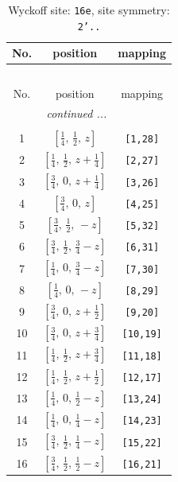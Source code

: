 \documentclass[fleqn,8pt]{jsarticle}
\begin{document}
\renewcommand{\arraystretch}{1.2}
\begin{longtable}{ccc}
\caption{Wyckoff site: {\tt 16e}, site symmetry: {\tt 2'..}}
 \\
 \hline \hline
No. & position & mapping \\ \hline \endfirsthead

\multicolumn{2}{l}{\tablename\ \thetable{}} \\
 \hline \hline
No. & position & mapping \\ \hline \endhead

 \hline \hline
\multicolumn{2}{r}{\footnotesize\it continued ...} \\ \endfoot

 \hline \hline
\multicolumn{2}{r}{} \\ \endlastfoot

1 & $\left[ \frac{1}{4},\, \frac{1}{2},\, z \right]$ & {\tt [1,28]} \\ \hline
2 & $\left[ \frac{1}{4},\, \frac{1}{2},\, z + \frac{1}{4} \right]$ & {\tt [2,27]} \\ \hline
3 & $\left[ \frac{3}{4},\, 0,\, z + \frac{1}{4} \right]$ & {\tt [3,26]} \\ \hline
4 & $\left[ \frac{3}{4},\, 0,\, z \right]$ & {\tt [4,25]} \\ \hline
5 & $\left[ \frac{3}{4},\, \frac{1}{2},\, - z \right]$ & {\tt [5,32]} \\ \hline
6 & $\left[ \frac{3}{4},\, \frac{1}{2},\, \frac{3}{4} - z \right]$ & {\tt [6,31]} \\ \hline
7 & $\left[ \frac{1}{4},\, 0,\, \frac{3}{4} - z \right]$ & {\tt [7,30]} \\ \hline
8 & $\left[ \frac{1}{4},\, 0,\, - z \right]$ & {\tt [8,29]} \\ \hline
9 & $\left[ \frac{3}{4},\, 0,\, z + \frac{1}{2} \right]$ & {\tt [9,20]} \\ \hline
10 & $\left[ \frac{3}{4},\, 0,\, z + \frac{3}{4} \right]$ & {\tt [10,19]} \\ \hline
11 & $\left[ \frac{1}{4},\, \frac{1}{2},\, z + \frac{3}{4} \right]$ & {\tt [11,18]} \\ \hline
12 & $\left[ \frac{1}{4},\, \frac{1}{2},\, z + \frac{1}{2} \right]$ & {\tt [12,17]} \\ \hline
13 & $\left[ \frac{1}{4},\, 0,\, \frac{1}{2} - z \right]$ & {\tt [13,24]} \\ \hline
14 & $\left[ \frac{1}{4},\, 0,\, \frac{1}{4} - z \right]$ & {\tt [14,23]} \\ \hline
15 & $\left[ \frac{3}{4},\, \frac{1}{2},\, \frac{1}{4} - z \right]$ & {\tt [15,22]} \\ \hline
16 & $\left[ \frac{3}{4},\, \frac{1}{2},\, \frac{1}{2} - z \right]$ & {\tt [16,21]} \\
\end{longtable}
\end{document}
